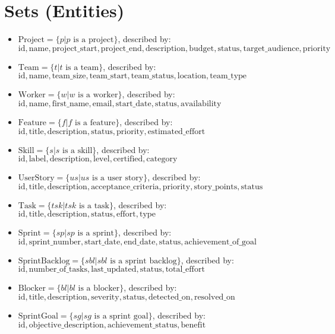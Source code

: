 \documentclass[11pt]{article}
\begin{document}
\section{Sets (Entities)}
\begin{itemize}
    \item $\text{Project} = \{p | p \text{ is a project}\}$, described by: $\text{id}, \text{name}, \text{project\_start}, \text{project\_end}, \text{description}, \text{budget}, \text{status}, \text{target\_audience}, \text{priority}$
    \item $\text{Team} = \{t | t \text{ is a team}\}$, described by: $\text{id}, \text{name}, \text{team\_size}, \text{team\_start}, \text{team\_status}, \text{location}, \text{team\_type}$
    \item $\text{Worker} = \{w | w \text{ is a worker}\}$, described by: $\text{id}, \text{name}, \text{first\_name}, \text{email}, \text{start\_date}, \text{status}, \text{availability}$
    \item $\text{Feature} = \{f | f \text{ is a feature}\}$, described by: $\text{id}, \text{title}, \text{description}, \text{status}, \text{priority}, \text{estimated\_effort}$
    \item $\text{Skill} = \{s | s \text{ is a skill}\}$, described by: $\text{id}, \text{label}, \text{description}, \text{level}, \text{certified}, \text{category}$
    \item $\text{UserStory} = \{us | us \text{ is a user story}\}$, described by: $\text{id}, \text{title}, \text{description}, \text{acceptance\_criteria}, \text{priority}, \text{story\_points}, \text{status}$
    \item $\text{Task} = \{tsk | tsk \text{ is a task}\}$, described by: $\text{id}, \text{title}, \text{description}, \text{status}, \text{effort}, \text{type}$
    \item $\text{Sprint} = \{sp | sp \text{ is a sprint}\}$, described by: $\text{id}, \text{sprint\_number}, \text{start\_date}, \text{end\_date}, \text{status}, \text{achievement\_of\_goal}$
    \item $\text{SprintBacklog} = \{sbl | sbl \text{ is a sprint backlog}\}$, described by: $\text{id}, \text{number\_of\_tasks}, \text{last\_updated}, \text{status}, \text{total\_effort}$
    \item $\text{Blocker} = \{bl | bl \text{ is a blocker}\}$, described by: $\text{id}, \text{title}, \text{description}, \text{severity}, \text{status}, \text{detected\_on}, \text{resolved\_on}$
    \item $\text{SprintGoal} = \{sg | sg \text{ is a sprint goal}\}$, described by: $\text{id}, \text{objective\_description}, \text{achievement\_status}, \text{benefit}$
\end{itemize}
\end{document}
